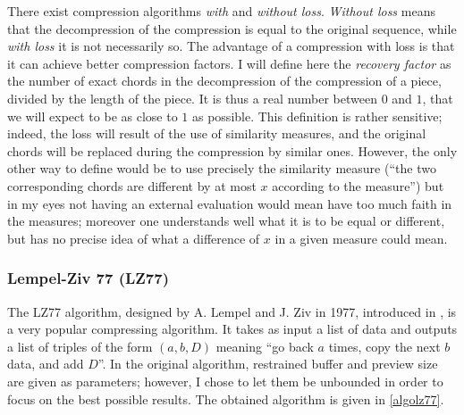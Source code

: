\documentclass[a4paper,10pt]{article}
\newcommand{\guill}[1]{``#1''}
\begin{document}
There exist compression algorithms \emph{with} and \emph{without loss}. \emph{Without loss} means that the decompression of the compression is equal to the original sequence, while \emph{with loss} it is not necessarily so. The advantage of a compression with loss is that it can achieve better compression factors. I will define here the \emph{recovery factor} as the number of exact chords in the decompression of the compression of a piece, divided by the length of the piece. It is thus a real number between $0$ and $1$, that we will expect to be as close to $1$ as possible. This definition is rather sensitive; indeed, the loss will result of the use of similarity measures, and the original chords will be replaced during the compression by similar ones. However, the only other way to define would be to use precisely the similarity measure (\guill{the two corresponding chords are different by at most $x$ according to the measure}) but in my eyes not having an external evaluation would mean have too much faith in the measures; moreover one understands well what it is to be equal or different, but has no precise idea of what a difference of $x$ in a given measure could mean.


\subsubsection{Lempel-Ziv 77 (LZ77)}

The LZ77 algorithm, designed by A. Lempel and J. Ziv in 1977, introduced in \cite{lempelziv}, is a very popular compressing algorithm. It takes as input a list of data and outputs a list of triples of the form $(a,b,D)$ meaning \guill{go back $a$ times, copy the next $b$ data, and add $D$}. In the original algorithm, restrained buffer and preview size are given as parameters; however, I chose to let them be unbounded in order to focus on the best possible results. The obtained algorithm is given in \ref{algolz77}.
\end{document}
